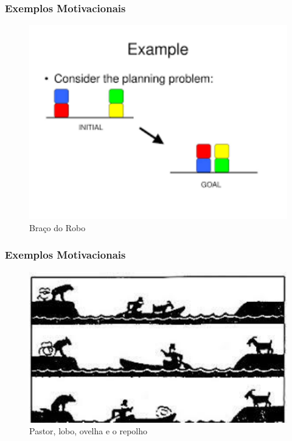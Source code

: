 \begin{frame}[fragile]
	
	\frametitle{Exemplos Motivacionais}

\begin{figure}[!htb]
	\centering
	\includegraphics[width=.7\textwidth, height=0.640\textheight]{figures/classical_planning.pdf}
	\caption{Braço do Robo}
\end{figure}

\end{frame}


\begin{frame}[fragile]
	
	\frametitle{Exemplos Motivacionais}
	
	\begin{figure}[!htb]
		\centering
		\includegraphics[width=.7\textwidth, height=0.640\textheight]{figures/sheperd.pdf}
		\caption{Pastor, lobo, ovelha e o repolho}
	\end{figure}
	
\end{frame}




